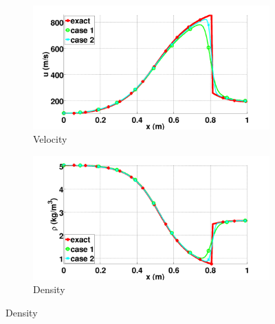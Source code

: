 %
\begin{figure}[H]
        \centering
        \begin{subfigure}[b]{0.5\textwidth}
                \centering
                \includegraphics[width=\textwidth]{figures/vapor_velocity_llf_and_exact_100.png}
                \caption{Velocity}
                \label{fig:vap-phase-vel}
        \end{subfigure}%
        \begin{subfigure}[b]{0.5\textwidth}
                \centering
                \includegraphics[width=\textwidth]{figures/vapor_density_llf_and_exact_100.png}
                \caption{Density}
                \label{fig:vap-phase-density}
        \end{subfigure}
        

\end{figure}
